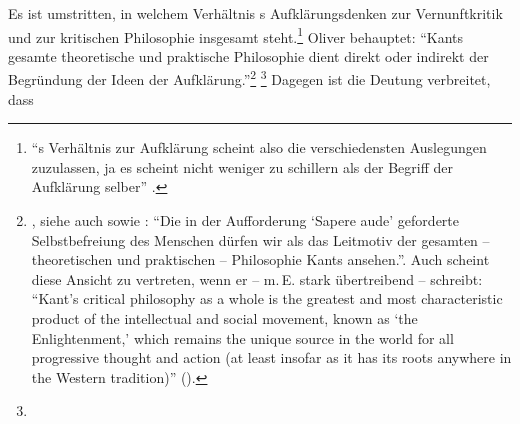 Es ist umstritten, in welchem Verhältnis s
Aufklärungsdenken zur Vernunftkritik und zur kritischen Philosophie insgesamt
steht.\footnote{\enquote{s Verhältnis zur Aufklärung
scheint also die verschiedensten Auslegungen zuzulassen, ja es scheint nicht weniger zu schillern
als der Begriff der Aufklärung selber}
\parencite[][31]{Hinske:KantalsHerausforderungandieGegenwart1980}.} Oliver
 behauptet: \enquote{Kants gesamte
theoretische und praktische Philosophie dient direkt oder indirekt der
Begründung der Ideen der
Aufklärung.}\footnote{\cite[][30]{Scholz:KantsAufklaerungsprogramm2009}, siehe
auch
\cite{Scholz:enquotedotsdenoberstenProbiersteinderWahrheitinsichselbstd.i.inseinereigenenVernunftsuchen2004}
sowie \cite[][23]{Recki:KantunddieAufklaerung2006}: \enquote{Die in der
Aufforderung \enquote{Sapere aude} geforderte Selbstbefreiung des Menschen
dürfen wir als das Leitmotiv der gesamten -- theoretischen und praktischen --
Philosophie Kants ansehen.}. Auch
 scheint diese Ansicht
zu vertreten, wenn er -- m.\,E. stark übertreibend -- schreibt:
\enquote{Kant's critical philosophy as a whole is the greatest and most
characteristic product of the intellectual and social movement, known as
\enquote{the Enlightenment,} which remains the unique source in the world for
all progressive thought and action (at least insofar as it has its roots
anywhere in the Western tradition)}
(\cite[][56]{Wood:KantandtheProblemofHumanNature2003}).}
\footnote{} Dagegen ist die Deutung verbreitet, dass
